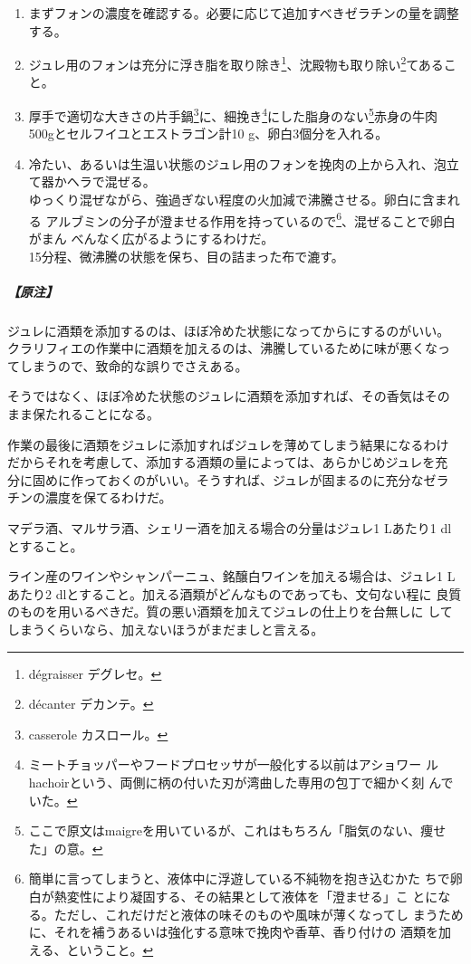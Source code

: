 \begin{recette}
\begin{enumerate}
\def\labelenumi{\arabic{enumi}.}
\item
  まずフォンの濃度を確認する。必要に応じて追加すべきゼラチンの量を調整する。
\item
  ジュレ用のフォンは充分に浮き脂を取り除き\footnote{dégraisser
    デグレセ。}、沈殿物も取り除い\footnote{décanter デカンテ。}てあること。
\item
  厚手で適切な大きさの片手鍋\footnote{casserole カスロール。}に、細挽き\footnote{ミートチョッパーやフードプロセッサが一般化する以前はアショワー
    ルhachoirという、両側に柄の付いた刃が湾曲した専用の包丁で細かく刻
    んでいた。}にした脂身のない\footnote{ここで原文はmaigreを用いているが、これはもちろん「脂気のない、痩せた」の意。}赤身の牛肉
  500gとセルフイユとエストラゴン計10 g、卵白3個分を入れる。
\item
  冷たい、あるいは生温い状態のジュレ用のフォンを挽肉の上から入れ、泡立て器かヘラで混ぜる。\\
  ゆっくり混ぜながら、強過ぎない程度の火加減で沸騰させる。卵白に含まれる
  アルブミンの分子が澄ませる作用を持っているので\footnote{簡単に言ってしまうと、液体中に浮遊している不純物を抱き込むかた
    ちで卵白が熱変性により凝固する、その結果として液体を「澄ませる」こ
    とになる。ただし、これだけだと液体の味そのものや風味が薄くなってし
    まうために、それを補うあるいは強化する意味で挽肉や香草、香り付けの
    酒類を加える、ということ。}、混ぜることで卵白がまん
  べんなく広がるようにするわけだ。\\
  15分程、微沸騰の状態を保ち、目の詰まった布で漉す。
\end{enumerate}

\hypertarget{ux539fux6ce8}{%
\subparagraph{【原注】}\label{ux539fux6ce8}}

ジュレに酒類を添加するのは、ほぼ冷めた状態になってからにするのがいい。
クラリフィエの作業中に酒類を加えるのは、沸騰しているために味が悪くなっ
てしまうので、致命的な誤りでさえある。

そうではなく、ほぼ冷めた状態のジュレに酒類を添加すれば、その香気はその
まま保たれることになる。

作業の最後に酒類をジュレに添加すればジュレを薄めてしまう結果になるわけ
だからそれを考慮して、添加する酒類の量によっては、あらかじめジュレを充
分に固めに作っておくのがいい。そうすれば、ジュレが固まるのに充分なゼラ
チンの濃度を保てるわけだ。

マデラ酒、マルサラ酒、シェリー酒を加える場合の分量はジュレ1 Lあたり1
dlとすること。

ライン産のワインやシャンパーニュ、銘醸白ワインを加える場合は、ジュレ1
Lあたり2 dlとすること。加える酒類がどんなものであっても、文句ない程に
良質のものを用いるべきだ。質の悪い酒類を加えてジュレの仕上りを台無しに
してしまうくらいなら、加えないほうがまだましと言える。


\end{recette}
